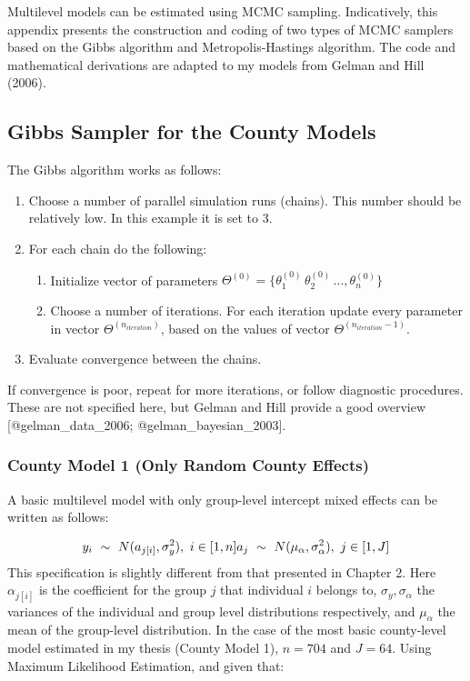 \documentclass[]{article}
\begin{document}
Multilevel models can be estimated using MCMC sampling. Indicatively,
this appendix presents the construction and coding of two types of MCMC
samplers based on the Gibbs algorithm and Metropolis-Hastings algorithm.
The code and mathematical derivations are adapted to my models from
Gelman and Hill (2006).

\subsection{Gibbs Sampler for the County
Models}\label{gibbs-sampler-for-the-county-models}

The Gibbs algorithm works as follows:

\begin{enumerate}
  \item Choose a number of parallel simulation runs (chains). This number should be relatively low. In this example it is set to 3.
  \item For each chain do the following:
  \begin{enumerate}
    \item Initialize vector of parameters $\Theta^{(0)} = \{\theta^{(0)}_1\, \theta^{(0)}_2\, ..., \theta^{(0)}_n\}$
    \item Choose a number of iterations. For each iteration update every parameter in vector $\Theta^{(n_{iteration})}$, based on the values of vector $\Theta^{(n_{iteration} - 1)}$.
  \end{enumerate}
  \item Evaluate convergence between the chains.
\end{enumerate}

If convergence is poor, repeat for more iterations, or follow diagnostic
procedures. These are not specified here, but Gelman and Hill provide a
good overview {[}@gelman\_data\_2006; @gelman\_bayesian\_2003{]}.

\subsubsection{County Model 1 (Only Random County
Effects)}\label{county-model-1-only-random-county-effects}

A basic multilevel model with only group-level intercept mixed effects
can be written as follows:

\[y_i \ \sim \ N(a_{j[i]}, \sigma^2_y),\ i \in [1, n] \\ a_j \ \sim \ N(\mu_{\alpha}, \sigma^2_{\alpha}), \ j \in [1,J]\]
This specification is slightly different from that presented in Chapter
2. Here \(\alpha_{j[i]}\) is the coefficient for the group \(j\) that
individual \(i\) belongs to, \(\sigma_y, \sigma_{\alpha}\) the variances
of the individual and group level distributions respectively, and
\(\mu_{\alpha}\) the mean of the group-level distribution. In the case
of the most basic county-level model estimated in my thesis (County
Model 1), \(n = 704\) and \(J = 64\). Using Maximum Likelihood
Estimation, and given that:
\end{document}
